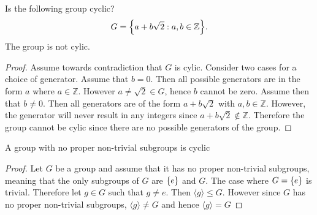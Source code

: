 \documentclass[../notes.tex]{subfiles}
\begin{document}
\begin{example}
	Is the following group cyclic?
	\[
		G = \qty{a + b \sqrt{2} : a,b \in \mathbb{Z}}
	.\]
	The group is not cylic.
	\begin{proof}
		Assume towards contradiction that $G$ is cylic. Consider two cases for a choice of generator. Assume that $b = 0$. Then all possible generators are in the form $a$ where $a \in \mathbb{Z}$. However $a \neq \sqrt{2} \in G$, hence $b$ cannot be zero. Assume then that $b \neq 0$. Then all generators are of the form $a + b \sqrt{2}$ with $a,b \in \mathbb{Z}$. However, the generator will never result in any integers since $a + b \sqrt{2} \notin \mathbb{Z}$. Therefore the group cannot be cylic since there are no possible generators of the group.
	\end{proof}
\end{example}

\begin{theorem}
	A group with no proper non-trivial subgroups is cyclic
\end{theorem}
\begin{proof}
	Let $G$ be a group and assume that it has no proper non-trivial subgroups, meaning that the only subgroups of $G$ are $\qty{e}$ and $G$. The case where $G = \qty{e}$ is trivial. Therefore let $g \in G$ such that $g \neq e$. Then $\langle g \rangle \leq G$. However since $G$ has no proper non-trivial subgroups, $\langle g \rangle \neq G$ and hence $\langle g \rangle = G$
\end{proof}
\end{document}
